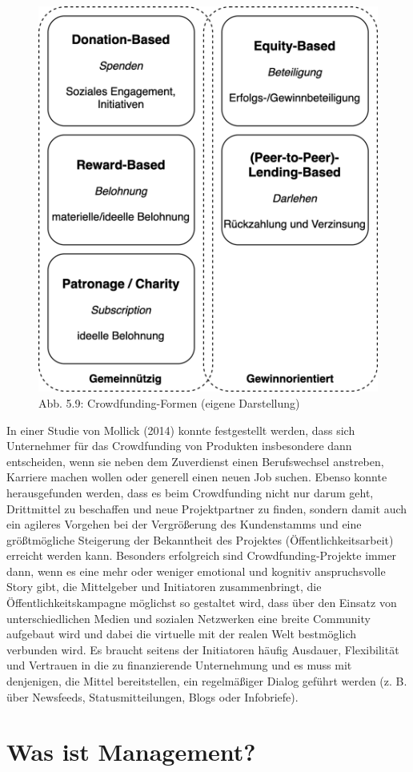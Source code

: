 \documentclass[
  letterpaper,
]{book}
\begin{document}
\begin{figure}

\includegraphics[width=0.5\linewidth,height=\textheight,keepaspectratio]{images/figure59.png} \hfill{}

\caption{Abb. 5.9: Crowdfunding-Formen (eigene Darstellung)}

\end{figure}%

In einer Studie von Mollick (2014) konnte festgestellt werden, dass sich
Unternehmer für das Crowdfunding von Produkten insbesondere dann
entscheiden, wenn sie neben dem Zuverdienst einen Berufswechsel
anstreben, Karriere machen wollen oder generell einen neuen Job suchen.
Ebenso konnte herausgefunden werden, dass es beim Crowdfunding nicht nur
darum geht, Drittmittel zu beschaffen und neue Projektpartner zu finden,
sondern damit auch ein agileres Vorgehen bei der Vergrößerung des
Kundenstamms und eine größtmögliche Steigerung der Bekanntheit des
Projektes (Öffentlichkeitsarbeit) erreicht werden kann. Besonders
erfolgreich sind Crowdfunding-Projekte immer dann, wenn es eine mehr
oder weniger emotional und kognitiv anspruchsvolle Story gibt, die
Mittelgeber und Initiatoren zusammenbringt, die Öffentlichkeitskampagne
möglichst so gestaltet wird, dass über den Einsatz von unterschiedlichen
Medien und sozialen Netzwerken eine breite Community aufgebaut wird und
dabei die virtuelle mit der realen Welt bestmöglich verbunden wird. Es
braucht seitens der Initiatoren häufig Ausdauer, Flexibilität und
Vertrauen in die zu finanzierende Unternehmung und es muss mit
denjenigen, die Mittel bereitstellen, ein regelmäßiger Dialog geführt
werden (z. B. über Newsfeeds, Statusmitteilungen, Blogs oder
Infobriefe).

\chapter{Was ist Management?}\label{management}
\end{document}
